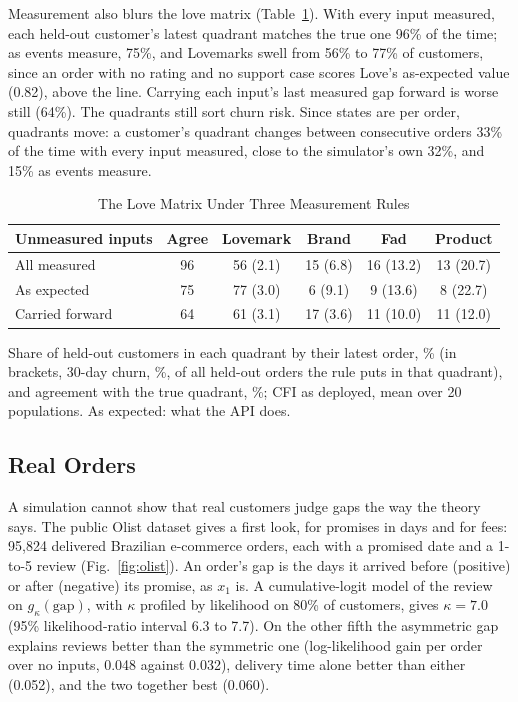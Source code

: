 \documentclass[10pt,twocolumn,letterpaper]{article}
\begin{document}
Measurement also blurs the love matrix (Table~\ref{tab:matrix}). With every input measured, each held-out customer's latest quadrant matches the true one 96\% of the time; as events measure, 75\%, and Lovemarks swell from 56\% to 77\% of customers, since an order with no rating and no support case scores Love's as-expected value (0.82), above the line. Carrying each input's last measured gap forward is worse still (64\%). The quadrants still sort churn risk. Since states are per order, quadrants move: a customer's quadrant changes between consecutive orders 33\% of the time with every input measured, close to the simulator's own 32\%, and 15\% as events measure.

\begin{table}[t]
\caption{The Love Matrix Under Three Measurement Rules}\label{tab:matrix}
\centering\footnotesize
\setlength{\tabcolsep}{3.5pt}
\begin{tabular}{@{}l c c c c c@{}}
\toprule
Unmeasured inputs & Agree & Lovemark & Brand & Fad & Product \\
\midrule
All measured & 96 & 56 (2.1) & 15 (6.8) & 16 (13.2) & 13 (20.7) \\
As expected & 75 & 77 (3.0) & 6 (9.1) & 9 (13.6) & 8 (22.7) \\
Carried forward & 64 & 61 (3.1) & 17 (3.6) & 11 (10.0) & 11 (12.0) \\
\bottomrule
\end{tabular}
\par\smallskip\parbox{\columnwidth}{\footnotesize Share of held-out customers in each quadrant by their latest order, \% (in brackets, 30-day churn, \%, of all held-out orders the rule puts in that quadrant), and agreement with the true quadrant, \%; CFI as deployed, mean over 20 populations. As expected: what the API does.}
\end{table}

\subsection{Real Orders}\label{sec:olist}

A simulation cannot show that real customers judge gaps the way the theory says. The public Olist dataset \cite{olist2018} gives a first look, for promises in days and for fees: 95,824 delivered Brazilian e-commerce orders, each with a promised date and a 1-to-5 review (Fig.~\ref{fig:olist}). An order's gap is the days it arrived before (positive) or after (negative) its promise, as $x_1$ is. A cumulative-logit model of the review \cite{mccullagh1980} on $g_\kappa(\text{gap})$, with $\kappa$ profiled by likelihood on 80\% of customers, gives $\kappa = 7.0$ (95\% likelihood-ratio interval 6.3 to 7.7). On the other fifth the asymmetric gap explains reviews better than the symmetric one (log-likelihood gain per order over no inputs, 0.048 against 0.032), delivery time alone better than either (0.052), and the two together best (0.060).
\end{document}
